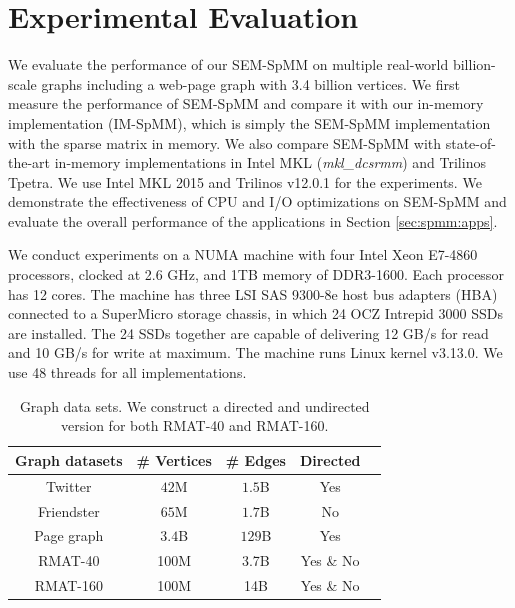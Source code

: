 \section{Experimental Evaluation}

We evaluate the performance of our SEM-SpMM on multiple real-world billion-scale
graphs including a web-page graph with 3.4 billion vertices. We first measure
the performance of SEM-SpMM and compare it with our in-memory implementation
(IM-SpMM), which is simply the SEM-SpMM implementation with the sparse matrix
in memory.
We also compare SEM-SpMM with state-of-the-art in-memory implementations in
Intel MKL (\textit{mkl\_dcsrmm}) and Trilinos Tpetra. We use Intel MKL 2015
and Trilinos v12.0.1 for the experiments. We demonstrate the effectiveness of
CPU and I/O optimizations on SEM-SpMM and evaluate the overall performance
of the applications in Section \ref{sec:spmm:apps}.

We conduct experiments on a NUMA machine with
four Intel Xeon E7-4860 processors, clocked at 2.6 GHz, and 1TB memory of
DDR3-1600. Each processor has 12 cores. The machine has three LSI SAS 9300-8e
host bus adapters (HBA) connected to a SuperMicro storage chassis, in which
24 OCZ Intrepid 3000 SSDs are installed. The 24 SSDs together are capable of
delivering 12 GB/s for read and 10 GB/s for write at maximum. The machine runs
Linux kernel v3.13.0. We use 48 threads for all implementations.

\begin{table}
\begin{center}
\footnotesize
\begin{tabular}{|c|c|c|c|c|}
\hline
Graph datasets & \# Vertices & \# Edges & Directed \\
\hline
Twitter \cite{twitter} & $42$M & $1.5$B & Yes \\
\hline
Friendster \cite{friendster} & $65$M & $1.7$B & No \\
\hline
Page graph \cite{web_graph} & $3.4$B & $129$B & Yes \\
\hline
RMAT-40 \cite{rmat} & 100M & 3.7B & Yes \& No \\
\hline
RMAT-160 \cite{rmat} & 100M & 14B & Yes \& No \\
\hline
\end{tabular}
\normalsize
\end{center}
\caption{Graph data sets. We construct a directed and undirected version for
both RMAT-40 and RMAT-160.}
\label{graphs}
\end{table}

